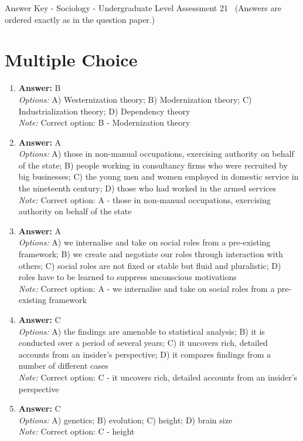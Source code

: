 \documentclass[12pt]{article}
\begin{document}
\begin{center}
Answer Key - Sociology - Undergraduate Level Assessment 21 \
\small (Answers are ordered exactly as in the question paper.)
\end{center}

\section*{Multiple Choice}
\begin{enumerate}[label=\arabic*.]
\item \textbf{Answer:} B
\\ \textit{Options:} A) Westernization theory; B) Modernization theory; C) Industrialization theory; D) Dependency theory
\\ \textit{Note:} Correct option: B - Modernization theory
\item \textbf{Answer:} A
\\ \textit{Options:} A) those in non-manual occupations, exercising authority on behalf of the state; B) people working in consultancy firms who were recruited by big businesses; C) the young men and women employed in domestic service in the nineteenth century; D) those who had worked in the armed services
\\ \textit{Note:} Correct option: A - those in non-manual occupations, exercising authority on behalf of the state
\item \textbf{Answer:} A
\\ \textit{Options:} A) we internalise and take on social roles from a pre-existing framework; B) we create and negotiate our roles through interaction with others; C) social roles are not fixed or stable but fluid and pluralistic; D) roles have to be learned to suppress unconscious motivations
\\ \textit{Note:} Correct option: A - we internalise and take on social roles from a pre-existing framework
\item \textbf{Answer:} C
\\ \textit{Options:} A) the findings are amenable to statistical analysis; B) it is conducted over a period of several years; C) it uncovers rich, detailed accounts from an insider's perspective; D) it compares findings from a number of different cases
\\ \textit{Note:} Correct option: C - it uncovers rich, detailed accounts from an insider's perspective
\item \textbf{Answer:} C
\\ \textit{Options:} A) genetics; B) evolution; C) height; D) brain size
\\ \textit{Note:} Correct option: C - height
\end{enumerate}
\end{document}
